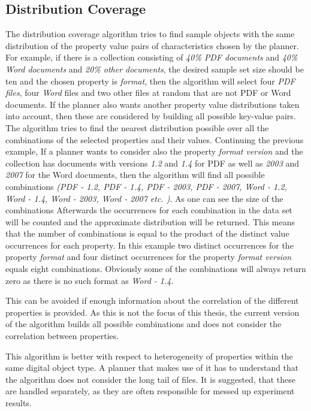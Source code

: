 \pagebreak
\subsection{Distribution Coverage}
The distribution coverage algorithm tries to find sample objects with the same distribution of the property value pairs of characteristics chosen by the planner. For example, if there is a collection consisting of \textit{40\% PDF documents} and \textit{40\% Word documents} and \textit{20\% other documents}, the desired sample set size should be ten and the chosen property is \textit{format}, then the algorithm will select four \textit{PDF files}, four \textit{Word} files and two other files at random that are not PDF or Word documents.
If the planner also wants another property value distributions taken into account, then these are considered by building all possible key-value pairs. The algorithm tries to find the nearest distribution possible over all the combinations of the selected properties and their values.
Continuing the previous example, If a planner wants to consider also the property \textit{format version} and the collection has documents with versions \textit{1.2} and \textit{1.4} for PDF as well as \textit{2003} and \textit{2007} for the Word documents, then the algorithm will find all possible combinations \textit{(PDF - 1.2, PDF - 1.4, PDF - 2003, PDF - 2007, Word - 1.2, Word - 1.4, Word - 2003, Word - 2007 etc. )}. As one can see the size of the combinations 
Afterwards the occurrences for each combination in the data set will be counted and the approximate distribution will be returned. This means that the number of combinations is equal to the product of the distinct value occurrences for each property. In this example two distinct occurrences for the property \textit{format} and four distinct occurrences for the property \textit{format version} equals eight combinations. Obviously some of the combinations will always return zero as there is no such format as \textit{Word - 1.4}. 

This can be avoided if enough information about the correlation of the different properties is provided. As this is not the focus of this thesis, the current version of the algorithm builds all possible combinations and does not consider the correlation between properties.

This algorithm is better with respect to heterogeneity of properties within the same digital object type. A planner that makes use of it has to understand that the algorithm does not consider the long tail of files. It is suggested, that these
are handled separately, as they are often responsible for messed up experiment results.

